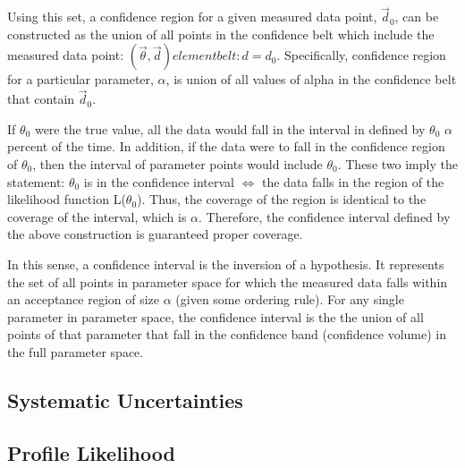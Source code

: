 Using this set, a confidence region for a given measured data point, $\vec{d}_0$, can be constructed as the union of all points in the confidence belt which include the measured data point: ${ ( \vec{ \theta }, \vec{d}) element belt : d = d_{0}}$.
Specifically, confidence region for a particular parameter, $\alpha$, is union of all values of alpha in the confidence belt that contain $\vec{d}_0$.

If $\theta_0$ were the true value, all the data would fall in the interval in defined by $\theta_0$ $\alpha$ percent of the time.
In addition, if the data were to fall in the confidence region of $\theta_0$, then the interval of parameter points would include $\theta_0$.
These two imply the statement: $\theta_0$ is in the confidence interval $\iff$ the data falls in the region of the likelihood function L($\theta_0$).
Thus, the coverage of the region is identical to the coverage of the interval, which is $\alpha$.
Therefore, the confidence interval defined by the above construction is guaranteed proper coverage.

In this sense, a confidence interval is the inversion of a hypothesis.
It represents the set of all points in parameter space for which the measured data falls within an acceptance region of size $\alpha$ (given some ordering rule).
For any single parameter in parameter space, the confidence interval is the the union of all points of that parameter that fall in the confidence band (confidence volume) in the full parameter space.


\subsection{Systematic Uncertainties}



\subsection{Profile Likelihood}


